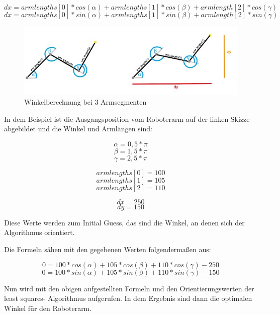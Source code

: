 \documentclass[12pt]{article}
\begin{document}
    \[
        dx = armlengths[0] * cos(\alpha) + armlengths[1] * cos(\beta) + armlength[2] * cos(\gamma)
    \]
    \[
        dx = armlengths[0] * sin(\alpha) + armlengths[1] * sin(\beta) + armlength[2] * sin(\gamma)
    \]

    

    \begin{figure}[h]
        \centering
        \includegraphics[width = \linewidth]{Bild 6}
        \caption{Winkelberechnung bei 3 Armsegmenten}
    \end{figure}

    In dem Beispiel ist die Ausgangsposition vom Roboterarm auf der linken Skizze abgebildet und die
    Winkel und Armlängen sind:

    \[
        \alpha = 0,5*\pi
    \]
    \[
        \beta = 1,5 * \pi
    \]
    \[
        \gamma = 2,5 * \pi
    \]

    \[
        armlengths[0] = 100
    \]
    \[
        armlengths[1] = 105
    \]
    \[
        armlengths[2] = 110
    \]

    \[
        dx = 250
    \]
    \[
        dy = 150
    \]

    Diese Werte werden zum Initial Guess, das sind die Winkel, an denen sich der Algorithmus
    orientiert.

    

    Die Formeln sähen mit den gegebenen Werten folgendermaßen aus:

    \[
        0 = 100 * cos(\alpha) + 105 * cos(\beta) + 110 * cos(\gamma) -250
    \]
    \[
        0 = 100 * sin(\alpha) + 105 * sin(\beta) + 110 * sin(\gamma) -150
    \]

    Nun wird mit den obigen aufgestellten Formeln und den Orientierungswerten der least squares-
    Algorithmus aufgerufen. In dem Ergebnis sind dann die optimalen Winkel für den Roboterarm.

    
\end{document}
